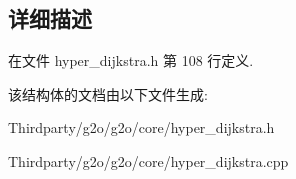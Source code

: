\subsection{详细描述}


在文件 hyper\-\_\-dijkstra.\-h 第 108 行定义.



该结构体的文档由以下文件生成\-:\begin{DoxyCompactItemize}
\item 
Thirdparty/g2o/g2o/core/hyper\-\_\-dijkstra.\-h\item 
Thirdparty/g2o/g2o/core/hyper\-\_\-dijkstra.\-cpp\end{DoxyCompactItemize}
